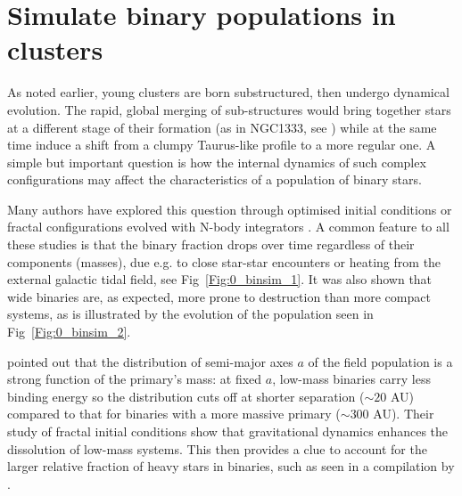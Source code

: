 \section{Simulate binary populations in clusters}

As noted earlier, young clusters are born substructured, then undergo dynamical evolution. The rapid, global  merging of sub-structures would bring together stars at a different stage of their  formation (as in NGC1333, see \citealt{Foster2015}) while at the same time induce a shift from a clumpy Taurus-like profile to a more regular one. A simple but important question is how the internal dynamics of such complex configurations may affect the  characteristics of a population of binary stars. 

Many authors have explored this question through optimised initial conditions \citep{Kroupa2001,Marks2012} or fractal configurations evolved with N-body integrators \citep{Parker2011,Geller2013,Parker2014}. A common feature to all these studies is that the binary fraction drops over time regardless of their components (masses), due e.g. to close star-star encounters or heating from the external galactic tidal field, see Fig~\ref{Fig:0_binsim_1}. It was also shown that wide binaries are, as expected, more prone to destruction than more compact systems, as is illustrated by the evolution of the population seen in Fig~\ref{Fig:0_binsim_2}.

 \cite{Parker2014} pointed out that the distribution of semi-major axes $a$ of the field population is a strong function of the primary's mass: at fixed $a$, low-mass binaries carry less binding energy so the distribution cuts off at shorter separation ($\sim 20 $ AU) compared to that for binaries with a more massive primary ($\sim 300$ AU). Their study of fractal initial conditions show that gravitational dynamics enhances the dissolution of low-mass systems. This then provides a clue to account for the larger relative fraction of heavy stars in binaries, such as seen in a compilation by \cite{Raghavan2010}. 
 
